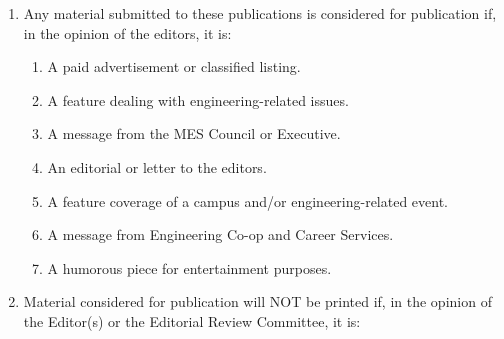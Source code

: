 \begin{enumerate}
 \item
  Any material submitted to these publications is considered for publication if, in the opinion of the editors, it is:

  \begin{enumerate}
   \item
    A paid advertisement or classified listing.
   \item
    A feature dealing with engineering-related issues.
   \item
    A message from the MES Council or Executive.
   \item
    An editorial or letter to the editors.
   \item
    A feature coverage of a campus and/or engineering-related event.
   \item
    A message from Engineering Co-op and Career Services.
   \item
    A humorous piece for entertainment purposes.
  \end{enumerate}
 \item
  Material considered for publication will NOT be printed if, in the opinion of the Editor(s) or the Editorial Review Committee, it is:


\end{enumerate}
